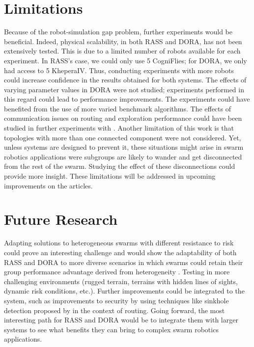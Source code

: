 \section{Limitations}\label{sec:Limitations}
Because of the robot-simulation gap problem, further experiments would be beneficial. Indeed, physical scalability, in both RASS and DORA, has not been extensively tested. This is due to a limited number of robots available for each experiment. In \ac{RASS}'s case, we could only use 5 CogniFlies; for \ac{DORA}, we only had access to 5 KheperaIV. Thus, conducting experiments with more robots could increase confidence in the results obtained for both systems. The effects of varying parameter values in \ac{DORA} were not studied; experiments performed in this regard could lead to performance improvements. The experiments could have benefited from the use of more varied benchmark algorithms. The effects of communication issues on routing and exploration performance could have been studied in further experiments with \cite{selden2021botnet}. Another limitation of this work is that topologies with more than one connected component were not considered. Yet, unless systems are designed to prevent it, these situations might arise in swarm robotics applications were subgroups are likely to wander and get disconnected from the rest of the swarm. Studying the effect of these disconnections could provide more insight. These limitations will be addressed in upcoming improvements on the articles.

\section{Future Research}
Adapting solutions to heterogeneous swarms with different resistance to risk could prove an interesting challenge and would show the adaptability of both RASS and DORA to more diverse scenarios in which swarms could retain their group performance advantage derived from heterogeneity \cite{ferrante2015evolution}. Testing in more challenging environments (rugged terrain, terrains with hidden lines of sights, dynamic risk conditions, etc.). Further improvements could be integrated to the system, such as improvements to security by using techniques like sinkhole detection proposed by \cite{abdullah2015detecting} in the context of routing. Going forward, the most interesting path for \ac{RASS} and \ac{DORA} would be to integrate them with larger systems to see what benefits they can bring to complex swarm robotics applications.